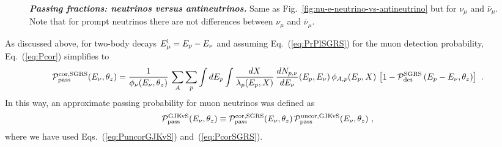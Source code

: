 \documentclass[aps,prd,showpacs,letterpaper,onecolumn,longbibliography,superscriptaddress,notitlepage,nofootinbib]{revtex4-1}%
\newcommand{\Emi}{E_{\mu}^{\rm i}}
\newcommand{\Prob}{{\cal P}}
\begin{document}
\begin{figure}
\centering
\caption{\textbf{\textit{Passing fractions: neutrinos versus antineutrinos.}} Same as Fig.~\ref{fig:nu-e-neutrino-vs-antineutrino} but for $\nu_\mu$ and $\bar\nu_\mu$. Note that for prompt neutrinos there are not differences between $\nu_\mu$ and $\bar\nu_\mu$.}
\label{fig:nu-mu-neutrino-vs-antineutrino}
\end{figure}

\pagebreak

As discussed above, for two-body decays $\Emi = E_p - E_\nu$ and assuming Eq.~(\ref{eq:PrPlSGRS}) for the muon detection probability, Eq.~(\ref{eq:Pcor}) simplifies to
%
\begin{equation}
\label{eq:PcorSGRS}
\Prob_{\rm pass}^{\rm cor, SGRS}(E_\nu, \theta_z) = \frac{1}{\phi_\nu(E_\nu, \theta_z)} \, \sum_A \sum_{p} \int dE_p  \int \frac{dX}{\lambda_p(E_p, X)} \, \frac{dN_{p, \nu}}{dE_\nu}(E_p, E_\nu) \, \phi_{A, p}(E_p, X) \,  
\left[1 - \Prob_{\rm det}^{\rm SGRS}\left(E_p-E_\nu , \theta_z\right)\right]~.
\end{equation}
%
In this way, an approximate passing probability for muon neutrinos was defined as~\cite{Gaisser:2014bja}
%
\begin{equation}
\label{eq:PGJKvS}
\Prob_{\rm pass}^{\rm GJKvS} (E_\nu, \theta_z) \equiv \Prob_{\rm pass}^{\rm cor, SGRS}(E_\nu, \theta_z) \, \Prob_{\rm pass}^{\rm uncor, GJKvS}(E_\nu, \theta_z) ~,
\end{equation}
%
where we have used Eqs.~(\ref{eq:PuncorGJKvS}) and~(\ref{eq:PcorSGRS}).
\end{document}
